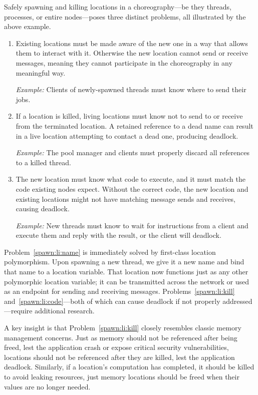 Safely spawning and killing locations in a choreography---be they threads, processes, or entire nodes---poses three distinct problems,
all illustrated by the above example.
\begin{enumerate}
  \item\label{spawn:li:name}
    Existing locations must be made aware of the new one in a way that allows them to interact with it.
    Otherwise the new location cannot send or receive messages, meaning they cannot participate in the choreography in any meaningful way.

    \textit{Example:} Clients of newly-spawned threads must know where to send their jobs.

  \item\label{spawn:li:kill}
    If a location is killed, living locations must know not to send to or receive from the terminated location.
    A retained reference to a dead name can result in a live location attempting to contact a dead one, producing deadlock.

    \textit{Example:} The pool manager and clients must properly discard all references to a killed thread.

  \item\label{spawn:li:code}
    The new location must know what code to execute, and it must match the code existing nodes expect.
    Without the correct code, the new location and existing locations might not have matching message sends and receives, causing deadlock.

    \textit{Example:} New threads must know to wait for instructions from a client and execute them
    and reply with the result, or the client will deadlock.
\end{enumerate}

Problem~\ref{spawn:li:name} is immediately solved by first-class location polymorphism.
Upon spawning a new thread, we give it a new name and bind that name to a location variable.
That location now functions just as any other polymorphic location variable;
it can be transmitted across the network or used as an endpoint for sending and receiving messages.
Problems~\ref{spawn:li:kill} and~\ref{spawn:li:code}---both of which can cause deadlock if not properly addressed---require additional research.

A key insight is that Problem~\ref{spawn:li:kill} closely resembles classic memory management concerns.
Just as memory should not be referenced after being freed, lest the application crash or expose critical security vulnerabilities,
locations should not be referenced after they are killed, lest the application deadlock.
Similarly, if a location's computation has completed, it should be killed to avoid leaking resources,
just memory locations should be freed when their values are no longer needed.

